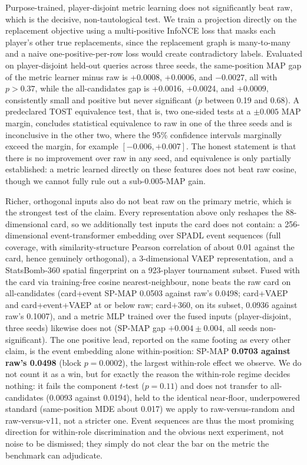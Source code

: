Purpose-trained, player-disjoint metric learning does not significantly beat
raw, which is the decisive, non-tautological test. We train a projection
directly on the replacement objective using a multi-positive InfoNCE loss that
masks each player's other true replacements, since the replacement graph is
many-to-many and a naive one-positive-per-row loss would create contradictory
labels. Evaluated on player-disjoint held-out queries across three seeds, the
same-position MAP gap of the metric learner minus raw is +0.0008, +0.0006, and
$-0.0027$, all with $p > 0.37$, while the all-candidates gap is +0.0016,
+0.0024, and +0.0009, consistently small and positive but never significant
($p$ between 0.19 and 0.68). A predeclared TOST equivalence test, that is, two
one-sided tests at a $\pm 0.005$ MAP margin, concludes statistical equivalence
to raw in one of the three seeds and is inconclusive in the other two, where
the 95\% confidence intervals marginally exceed the margin, for example
$[-0.006, +0.007]$. The honest statement is that there is no improvement over
raw in any seed, and equivalence is only partially established: a metric
learned directly on these features does not beat raw cosine, though we cannot
fully rule out a sub-0.005-MAP gain.

Richer, orthogonal inputs also do not beat raw on the primary metric, which is
the strongest test of the claim. Every representation above only reshapes the
88-dimensional card, so we additionally test inputs the card does not contain: a
256-dimensional event-transformer embedding over SPADL event sequences (full
coverage, with similarity-structure Pearson correlation of about 0.01 against
the card, hence genuinely orthogonal), a 3-dimensional VAEP representation, and
a StatsBomb-360 spatial fingerprint on a 923-player tournament subset. Fused
with the card via training-free cosine nearest-neighbour, none beats the raw
card on all-candidates (card+event SP-MAP 0.0503 against raw's 0.0498; card+VAEP
and card+event+VAEP at or below raw; card+360, on its subset, 0.0936 against
raw's 0.1007), and a metric MLP trained over the fused inputs (player-disjoint,
three seeds) likewise does not (SP-MAP gap $+0.004 \pm 0.004$, all seeds
non-significant). The one positive lead, reported on the same footing as every
other claim, is the event embedding alone within-position: SP-MAP \textbf{0.0703
against raw's 0.0498} (block $p = 0.0002$), the largest within-role effect we
observe. We do not count it as a win, but for exactly the reason the within-role
regime decides nothing: it fails the component $t$-test ($p = 0.11$) and does
not transfer to all-candidates (0.0093 against 0.0194), held to the identical
near-floor, underpowered standard (same-position MDE about 0.017) we apply to
raw-versus-random and raw-versus-v11, not a stricter one. Event sequences are
thus the most promising direction for within-role discrimination and the obvious
next experiment, not noise to be dismissed; they simply do not clear the bar on
the metric the benchmark can adjudicate.

